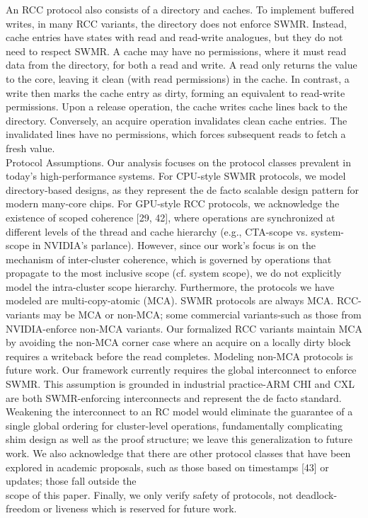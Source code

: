 \documentclass[10pt]{article}
\begin{document}
An RCC protocol also consists of a directory and caches. To implement buffered writes, in many RCC variants, the directory does not enforce SWMR. Instead, cache entries have states with read and read-write analogues, but they do not need to respect SWMR. A cache may have no permissions, where it must read data from the directory, for both a read and write. A read only returns the value to the core, leaving it clean (with read permissions) in the cache. In contrast, a write then marks the cache entry as dirty, forming an equivalent to read-write permissions. Upon a release operation, the cache writes cache lines back to the directory. Conversely, an acquire operation invalidates clean cache entries. The invalidated lines have no permissions, which forces subsequent reads to fetch a fresh value.\\[0pt]
Protocol Assumptions. Our analysis focuses on the protocol classes prevalent in today's high-performance systems. For CPU-style SWMR protocols, we model directory-based designs, as they represent the de facto scalable design pattern for modern many-core chips. For GPU-style RCC protocols, we acknowledge the existence of scoped coherence [29, 42], where operations are synchronized at different levels of the thread and cache hierarchy (e.g., CTA-scope vs. system-scope in NVIDIA's parlance). However, since our work's focus is on the mechanism of inter-cluster coherence, which is governed by operations that propagate to the most inclusive scope (cf. system scope), we do not explicitly model the intra-cluster scope hierarchy. Furthermore, the protocols we have modeled are multi-copy-atomic (MCA). SWMR protocols are always MCA. RCC-variants may be MCA or non-MCA; some commercial variants-such as those from NVIDIA-enforce non-MCA variants. Our formalized RCC variants maintain MCA by avoiding the non-MCA corner case where an acquire on a locally dirty block requires a writeback before the read completes. Modeling non-MCA protocols is future work. Our framework currently requires the global interconnect to enforce SWMR. This assumption is grounded in industrial practice-ARM CHI and CXL are both SWMR-enforcing interconnects and represent the de facto standard. Weakening the interconnect to an RC model would eliminate the guarantee of a single global ordering for cluster-level operations, fundamentally complicating shim design as well as the proof structure; we leave this generalization to future work. We also acknowledge that there are other protocol classes that have been explored in academic proposals, such as those based on timestamps [43] or updates; those fall outside the\\
scope of this paper. Finally, we only verify safety of protocols, not deadlock-freedom or liveness which is reserved for future work.
\end{document}
